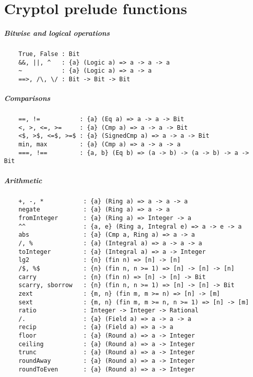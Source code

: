 \chapter{Cryptol prelude functions}


\paragraph*{Bitwise and logical operations}
\begin{Verbatim}
    True, False : Bit
    &&, ||, ^   : {a} (Logic a) => a -> a -> a
    ~           : {a} (Logic a) => a -> a
    ==>, /\, \/ : Bit -> Bit -> Bit
\end{Verbatim}
\paragraph*{Comparisons}
\begin{Verbatim}
    ==, !=           : {a} (Eq a) => a -> a -> Bit
    <, >, <=, >=     : {a} (Cmp a) => a -> a -> Bit
    <$, >$, <=$, >=$ : {a} (SignedCmp a) => a -> a -> Bit
    min, max         : {a} (Cmp a) => a -> a -> a
    ===, !==         : {a, b} (Eq b) => (a -> b) -> (a -> b) -> a -> Bit
\end{Verbatim}
\paragraph*{Arithmetic}
\begin{Verbatim}
    +, -, *           : {a} (Ring a) => a -> a -> a
    negate            : {a} (Ring a) => a -> a
    fromInteger       : {a} (Ring a) => Integer -> a
    ^^                : {a, e} (Ring a, Integral e) => a -> e -> a
    abs               : {a} (Cmp a, Ring a) => a -> a
    /, %              : {a} (Integral a) => a -> a -> a
    toInteger         : {a} (Integral a) => a -> Integer
    lg2               : {n} (fin n) => [n] -> [n]
    /$, %$            : {n} (fin n, n >= 1) => [n] -> [n] -> [n]
    carry             : {n} (fin n) => [n] -> [n] -> Bit
    scarry, sborrow   : {n} (fin n, n >= 1) => [n] -> [n] -> Bit
    zext              : {m, n} (fin m, m >= n) => [n] -> [m]
    sext              : {m, n} (fin m, m >= n, n >= 1) => [n] -> [m]
    ratio             : Integer -> Integer -> Rational
    /.                : {a} (Field a) => a -> a -> a
    recip             : {a} (Field a) => a -> a
    floor             : {a} (Round a) => a -> Integer
    ceiling           : {a} (Round a) => a -> Integer
    trunc             : {a} (Round a) => a -> Integer
    roundAway         : {a} (Round a) => a -> Integer
    roundToEven       : {a} (Round a) => a -> Integer
\end{Verbatim}
